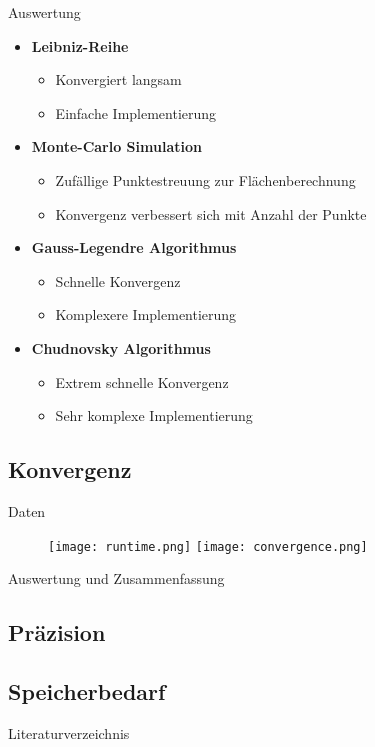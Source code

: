 \documentclass[9pt, t]{beamer}
\begin{document}
\begin{frame}{Auswertung}
    \begin{itemize}
        \item<1-> \textbf{Leibniz-Reihe}
              \begin{itemize}
                  \item Konvergiert langsam
                  \item Einfache Implementierung
              \end{itemize}
        \item<2-> \textbf{Monte-Carlo Simulation}
              \begin{itemize}
                  \item Zufällige Punktestreuung zur Flächenberechnung
                  \item Konvergenz verbessert sich mit Anzahl der Punkte
              \end{itemize}
        \item<3-> \textbf{Gauss-Legendre Algorithmus}
              \begin{itemize}
                  \item Schnelle Konvergenz
                  \item Komplexere Implementierung
              \end{itemize}
        \item<4-> \textbf{Chudnovsky Algorithmus}
              \begin{itemize}
                  \item Extrem schnelle Konvergenz
                  \item Sehr komplexe Implementierung
              \end{itemize}
    \end{itemize}
\end{frame}

\subsection{Konvergenz}

\begin{frame}{Daten}
    \begin{figure}
        \begin{center}
            \leavevmode
            \texttt{[image: runtime.png]}
            \texttt{[image: convergence.png]}
        \end{center}
    \end{figure}
\end{frame}

\begin{frame}{Auswertung und Zusammenfassung}

\end{frame}

\subsection{Präzision}

\subsection{Speicherbedarf}

\begin{frame}{Literaturverzeichnis}
    \printbibliography
\end{frame}
\end{document}
